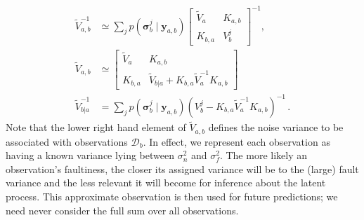 \documentclass{article} %
\newcommand{\deq}{=}
\newcommand{\given}{\!\ensuremath{\mid}\!}
\newcommand{\cm}[1]{\ensuremath{\mathcal{#1}}}
\newcommand{\bm}[1]{\ensuremath{\mathbf{#1}}}
\newcommand{\data}{\ensuremath{\cm{D}}}
\newcommand{\vect}[1]{\bm{#1}}
\newcommand{\vy}{\vect{y}}
\newcommand{\vs}{\vect{\sigma}}
\newcommand{\fPr}{p}
\newcommand{\Prob}[2]{\fPr(#1 \given #2 )}
\begin{document}
\begin{align*}
\tilde{V}^{-1}_{a,b} &\simeq \sum_j \Prob{\vs^j_{b}}{\vy_{a,b}} \begin{bmatrix}
 \tilde{V}_a & K_{a,b}
\\
 K_{b,a} & V^j_b
\end{bmatrix}^{-1},
\nonumber\\
\tilde{V}_{a,b} & \simeq
\begin{bmatrix}
 \tilde{V}_a & K_{a,b}\\
 K_{b,a} & \tilde{V}_{b|a} + K_{b,a} \tilde{V}_a^{-1} K_{a,b}
\end{bmatrix}\\
% 
 \tilde{V}^{-1}_{b|a} & \deq \sum_j \Prob{\vs^j_{b}}{\vy_{a,b}} (V^j_b -K_{b,a} \tilde{V}_a^{-1}K_{a,b})^{-1}\,.
\end{align*}
 Note that the
lower right hand element of $\tilde{V}_{a,b}$ defines the noise
variance to be associated with observations $\data_b$. In effect, we represent
each observation as having a known variance lying between
$\sigma_n^2$ and $\sigma_f^2$. The more likely an observation's
faultiness, the closer its assigned variance will be to the (large)
fault variance and the less relevant it will become for inference
about the latent process. This approximate observation is then used
for future predictions; we need never consider the full sum over all
observations. 
\end{document}
